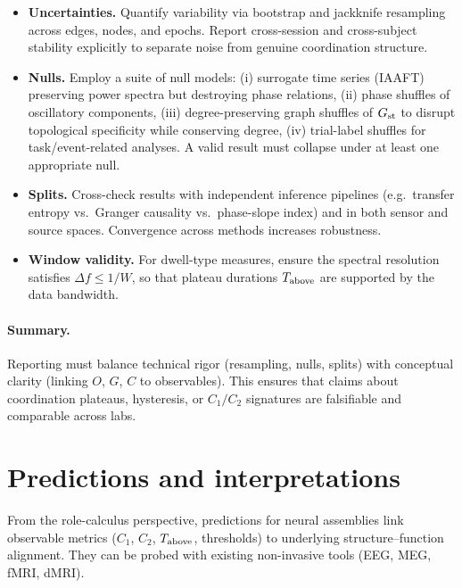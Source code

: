 \documentclass[12pt,a4paper,oneside]{scrreprt}
\begin{document}
\begin{itemize}
\item \textbf{Uncertainties.} 
Quantify variability via bootstrap and jackknife resampling across edges, nodes, and epochs. 
Report cross-session and cross-subject stability explicitly to separate noise from genuine coordination structure.

\item \textbf{Nulls.} 
Employ a suite of null models:
(i) surrogate time series (IAAFT) preserving power spectra but destroying phase relations, 
(ii) phase shuffles of oscillatory components, 
(iii) degree-preserving graph shuffles of $G_{\rm st}$ to disrupt topological specificity while conserving degree, 
(iv) trial-label shuffles for task/event-related analyses.
A valid result must collapse under at least one appropriate null.

\item \textbf{Splits.} 
Cross-check results with independent inference pipelines 
(e.g.\ transfer entropy vs.\ Granger causality vs.\ phase-slope index) 
and in both sensor and source spaces. 
Convergence across methods increases robustness.

\item \textbf{Window validity.} 
For dwell-type measures, ensure the spectral resolution satisfies 
$\Delta f \le 1/W$, 
so that plateau durations $T_{\rm above}$ are supported by the data bandwidth.
\end{itemize}

\paragraph{Summary.} 
Reporting must balance technical rigor (resampling, nulls, splits) 
with conceptual clarity (linking $O$, $G$, $C$ to observables). 
This ensures that claims about coordination plateaus, hysteresis, or $C_1/C_2$ signatures 
are falsifiable and comparable across labs.

\section{Predictions and interpretations}\label{sec:human-predict}

From the role-calculus perspective, predictions for neural assemblies link 
observable metrics ($C_1$, $C_2$, $T_{\rm above}$, thresholds) 
to underlying structure--function alignment. 
They can be probed with existing non-invasive tools (EEG, MEG, fMRI, dMRI).
\end{document}
